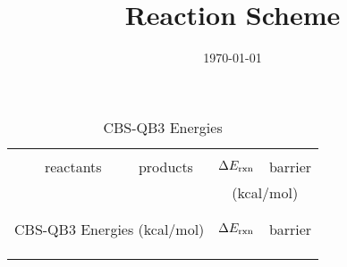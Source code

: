 \documentclass[11pt]{article}
\title{Reaction Scheme}
\date{\today}
\begin{document}


\begin{center}
\begin{longtable}{  l c @{ $\rightleftharpoons$ } c  c  c c }
\caption{CBS-QB3 Energies} \label{cbsqb3} \\
\hline \hline \\[-2ex]
& reactants & products & 
$\Delta E_{\rm rxn}$ &
\multicolumn{2}{c}{barrier} \\
\multicolumn{3}{c}{} & \multicolumn{3}{c}{(kcal/mol)} 
\\[0.5ex] \hline
   \\[-1.8ex]
\endfirsthead

  \hline \hline \\[-2ex]
\multicolumn{3}{l}{CBS-QB3 Energies (kcal/mol)} & $\Delta E_{\rm rxn}$ &
\multicolumn{2}{c}{barrier}
\\[0.5ex] \hline
  \\[-1.8ex]
\endhead

\endfoot

  \\[-1.8ex] \hline \hline
\endlastfoot





\end{longtable}
\end{center}


\end{document}
